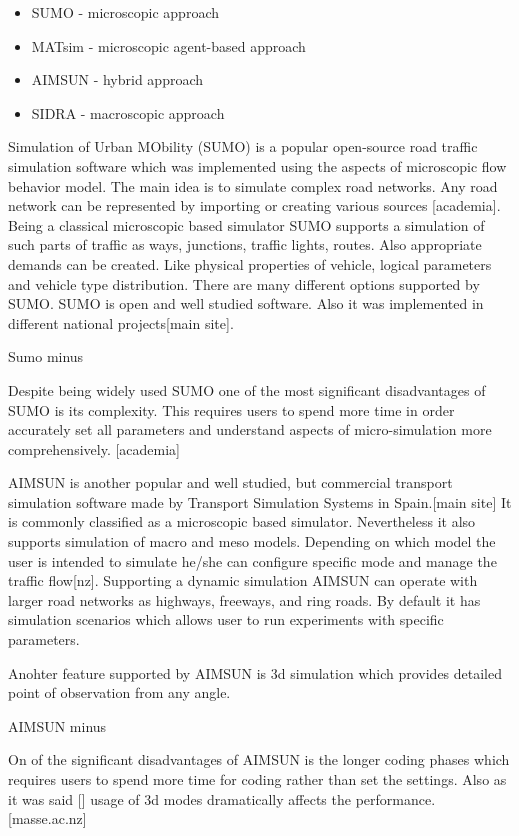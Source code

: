 \begin{itemize}
    \item SUMO -  microscopic approach
    \item MATsim - microscopic agent-based approach
    \item AIMSUN - hybrid approach
    \item SIDRA - macroscopic approach
\end{itemize}

Simulation of Urban MObility (SUMO) is a popular open-source road traffic simulation software which was implemented using the aspects of microscopic flow behavior model.
The main idea is to simulate complex road networks. Any road network can be represented by importing or creating various sources [academia].
Being a classical microscopic based simulator SUMO supports a simulation of such parts of traffic as ways, junctions, traffic lights, routes.
Also appropriate demands can be created. Like physical properties of vehicle, logical parameters and vehicle type distribution.
There are many different options supported by SUMO.
SUMO is open and well studied software. Also it was implemented in different national projects[main site].

Sumo minus

Despite being widely used SUMO one of the most significant disadvantages of SUMO is its complexity.
This requires users to spend more time in order accurately set
all parameters and understand aspects of micro-simulation more comprehensively. [academia]




AIMSUN is another popular and well studied, but commercial
transport simulation software made by Transport Simulation Systems in Spain.[main site]
It is commonly classified as a microscopic based simulator.
Nevertheless it also supports simulation of macro and meso models.
Depending on which model the user is intended to simulate he/she can configure specific mode and manage the traffic flow[nz].
Supporting a dynamic simulation AIMSUN can operate with larger road networks as highways, freeways, and ring roads.
By default it has simulation scenarios which allows user to run experiments with specific parameters.

Anohter feature  supported by AIMSUN is 3d simulation which provides detailed point of observation from any angle.

AIMSUN minus

On of the significant disadvantages of AIMSUN is the longer coding phases which
requires users to spend more time for coding rather than set the settings.
Also as it was said [] usage of 3d modes dramatically affects the performance.[masse.ac.nz]

